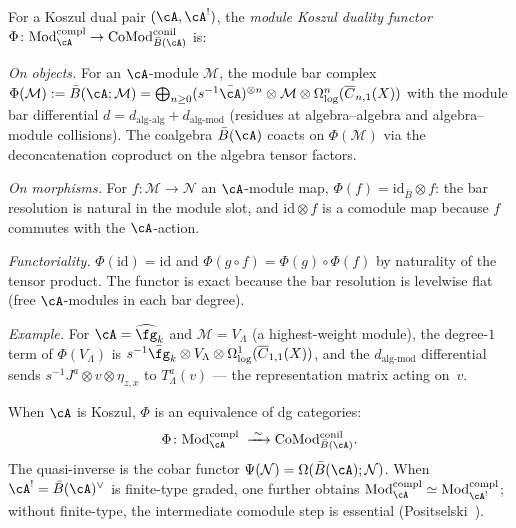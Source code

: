\begin{definition}
\label{def:module-koszul-functor}
\label{rem:koszul-module-categories}%
For a Koszul dual pair $(\cA, \cA^!)$, the \emph{module Koszul
duality functor}
$\Phi\colon \mathrm{Mod}^{\mathrm{compl}}_{\cA}
\to \mathrm{CoMod}^{\mathrm{conil}}_{\bar{B}(\cA)}$
is:

\emph{On objects.}  For an $\cA$-module $\mathcal{M}$, the module
bar complex
$\Phi(\mathcal{M}) := \bar{B}(\cA; \mathcal{M})
= \bigoplus_{n \ge 0}
(s^{-1}\bar{\cA})^{\otimes n} \otimes \mathcal{M}
\otimes \Omega^n_{\log}(\overline{C}_{n,1}(X))$
with the module bar differential
$d = d_{\mathrm{alg\text{-}alg}} + d_{\mathrm{alg\text{-}mod}}$
(residues at algebra--algebra and algebra--module collisions).
The coalgebra $\bar{B}(\cA)$ coacts on $\Phi(\mathcal{M})$ via
the deconcatenation coproduct on the algebra tensor factors.

\emph{On morphisms.}  For $f\colon \mathcal{M} \to \mathcal{N}$
an $\cA$-module map, $\Phi(f) = \mathrm{id}_{\bar{B}} \otimes f$:
the bar resolution is natural in the module slot, and
$\mathrm{id} \otimes f$ is a comodule map because $f$ commutes
with the $\cA$-action.

\emph{Functoriality.}  $\Phi(\mathrm{id}) = \mathrm{id}$ and
$\Phi(g \circ f) = \Phi(g) \circ \Phi(f)$ by naturality of the
tensor product.  The functor is exact because the bar resolution
is levelwise flat (free $\cA$-modules in each bar degree).

\emph{Example.}  For $\cA = \widehat{\fg}_k$ and
$\mathcal{M} = V_\Lambda$ (a highest-weight module), the
degree-$1$ term of $\Phi(V_\Lambda)$ is
$s^{-1}\bar{\fg}_k \otimes V_\Lambda \otimes
\Omega^1_{\log}(\overline{C}_{1,1}(X))$, and the
$d_{\mathrm{alg\text{-}mod}}$ differential sends
$s^{-1}J^a \otimes v \otimes \eta_{z,x}$ to
$T^a_\Lambda(v)$ --- the representation matrix acting on~$v$.
\end{definition}

\begin{proposition}
\label{prop:module-koszul-equivalence}
When $\cA$ is Koszul, $\Phi$ is an equivalence of dg categories:
\[
\Phi\colon
\mathrm{Mod}^{\mathrm{compl}}_{\cA}
\;\xrightarrow{\;\sim\;}
\mathrm{CoMod}^{\mathrm{conil}}_{\bar{B}(\cA)}.
\]
The quasi-inverse is the cobar functor
$\Psi(\mathcal{N}) = \Omega(\bar{B}(\cA); \mathcal{N})$.
When $\cA^! = \bar{B}(\cA)^\vee$ is finite-type graded, one further
obtains
$\mathrm{Mod}^{\mathrm{compl}}_{\cA}
\simeq \mathrm{Mod}^{\mathrm{compl}}_{\cA^!}$; without finite-type,
the intermediate comodule step is essential (Positselski~\cite[\S4]{Positselski11}).
\end{proposition}

